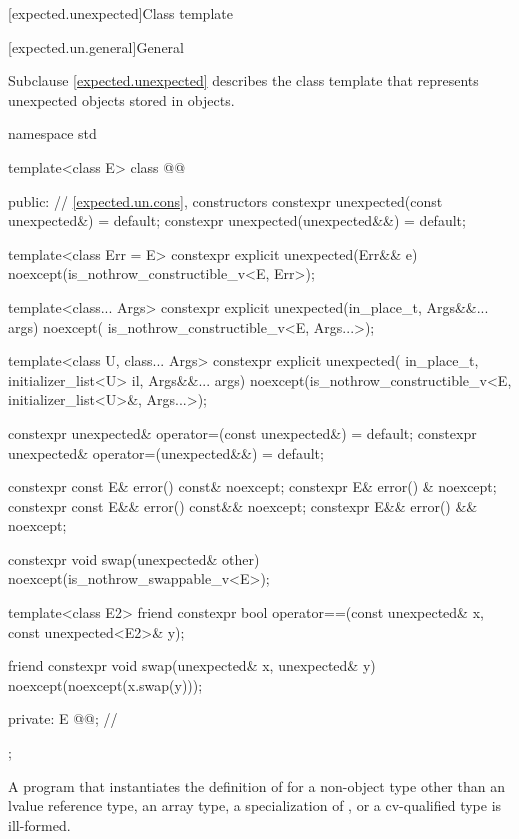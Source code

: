 [expected.unexpected]{Class template }

[expected.un.general]{General}

\pnum
Subclause \ref{expected.unexpected} describes the class template  that represents unexpected objects stored in  objects.

\begin{codeblock}
namespace std {
  template<class E>
  class @@ {
  public:
    // \ref{expected.un.cons}, constructors
    constexpr unexpected(const unexpected&) = default;
    constexpr unexpected(unexpected&&) = default;

    template<class Err = E>
    constexpr explicit unexpected(Err&& e) noexcept(is_nothrow_constructible_v<E, Err>);

    template<class... Args>
    constexpr explicit unexpected(in_place_t, Args&&... args) noexcept(
        is_nothrow_constructible_v<E, Args...>);

    template<class U, class... Args>
    constexpr explicit unexpected(
        in_place_t, initializer_list<U> il,
        Args&&... args) noexcept(is_nothrow_constructible_v<E, initializer_list<U>&,
                                                            Args...>);

    constexpr unexpected& operator=(const unexpected&) = default;
    constexpr unexpected& operator=(unexpected&&) = default;

    constexpr const E& error() const& noexcept;
    constexpr E& error() & noexcept;
    constexpr const E&& error() const&& noexcept;
    constexpr E&& error() && noexcept;

    constexpr void swap(unexpected& other) noexcept(is_nothrow_swappable_v<E>);

    template<class E2>
    friend constexpr bool operator==(const unexpected& x, const unexpected<E2>& y);

    friend constexpr void swap(unexpected& x,
                               unexpected& y) noexcept(noexcept(x.swap(y)));

  private:
    E @@; // \expos
  };
}
\end{codeblock}

\pnum
A program that instantiates the definition of  for a non-object type other than an lvalue reference type, an array type, a specialization of , or a cv-qualified type is ill-formed.


